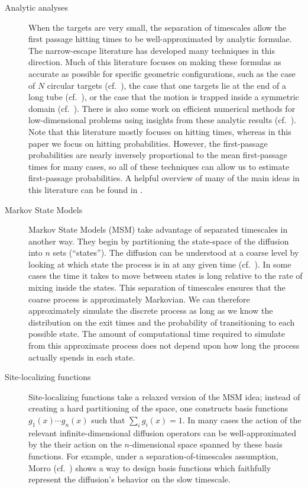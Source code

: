 \documentclass[12pt, nofootinbib,english, amsmath, amssymb, aps, priprint, graphicx,floatfix,draft]{revtex4-1}
\theoremstyle{plain}
\theoremstyle{definition}
\theoremstyle{plain}
\begin{document}
\begin{description}
    \item[Analytic analyses] When the targets are very small, the separation of timescales allow the first passage hitting times to be well-approximated by analytic formulae.  The narrow-escape literature has developed many techniques in this direction.  Much of this literature focuses on making these formulas as accurate as possible for specific geometric configurations, such as the case of $N$ circular targets (cf.\ \cite{cheviakov2010asymptotic}), the case that one targets lie at the end of a long tube (cf.\ \cite{li2014matched}), or the case that the motion is trapped inside a symmetric domain (cf.\ \cite{Chevalier2010-bq,Condamin2006-vi,Coombs2009-pe,Lindsay2017-ds}).  There is also some work on efficient numerical methods for low-dimensional problems using insights from these analytic results (cf.\ \cite{kaye2019fast}).  Note that this literature mostly focuses on hitting times, whereas in this paper we focus on hitting probabilities.   However, the first-passage probabilities are nearly inversely proportional to the mean first-passage times for many cases, so all of these techniques can allow us to estimate first-passage probabilities.  A helpful overview of many of the main ideas in this literature can be found in \cite{Benichou2014-jb}.

    \item[Markov State Models] Markov State Models (MSM) take advantage of separated timescales in another way.  They begin by partitioning the state-space of the diffusion into $n$ sets (``states'').  The diffusion can be understood at a coarse level by looking at which state the process is in at any given time (cf.\ \cite{Pande2010-yi, Chodera2014-bh, Husic2018-xp}).   In some cases the time it takes to move between states is long relative to the rate of mixing inside the states.  This separation of timescales ensures that the coarse process is approximately Markovian.  We can therefore approximately simulate the discrete process as long as we know the distribution on the exit times and the probability of transitioning to each possible state.  The amount of computational time required to simulate from this approximate process does not depend upon how long the process actually spends in each state.

    \item[Site-localizing functions] Site-localizing functions take a relaxed version of the MSM idea; instead of creating a hard partitioning of the space, one constructs basis functions $g_1(x)\cdots g_n(x)$ such that $\sum_i g_i(x)=1$.  In many cases the action of the relevant infinite-dimensional diffusion operators can be well-approximated by the their action on the $n$-dimensional space spanned by these basis functions.   For example, under a separation-of-timescales assumption, Morro (cf.\ \cite{moro1995kinetic}) shows a way to design basis functions which faithfully represent the diffusion's behavior on the slow timescale.


\end{description}
\end{document}

